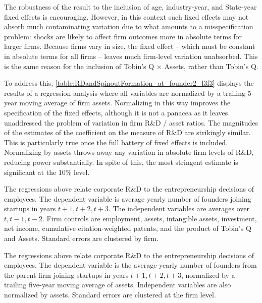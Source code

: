 \documentclass[11pt,english]{article}
\theoremstyle{remark}
\begin{document}
The robustness of the result to the inclusion of age, industry-year, and State-year fixed effects is encouraging. However, in this context such fixed effects may not absorb much contaminating variation due to what amounts to a misspecification problem: shocks are likely to affect firm outcomes more in absolute terms for larger firms. Because firms vary in size, the fixed effect -- which must be constant in absolute terms for all firms -- leaves much firm-level variation unabsorbed. This is the same reason for the inclusion of Tobin's Q $\times$ Assets, rather than Tobin's Q. 

To address this, \autoref{table:RDandSpinoutFormation_at_founder2_l3f3} displays the results of a regression analysis where all variables are normalized by a trailing 5-year moving average of firm assets. Normalizing in this way improves the specification of the fixed effects, although it is not a panacea as it leaves unaddressed the problem of variation in firm R\&D / asset ratios. The magnitudes of the estimates of the coefficient on the measure of R\&D are strikingly similar. This is particularly true once the full battery of fixed effects is included. Normalizing by assets throws away any variation in absolute firm levels of R\&D, reducing power substantially. In spite of this, the most stringent estimate is significant at the 10\% level.

\begin{table}[!htb]
	\scriptsize
	\centering
	
	\caption{The regressions above relate corporate R\&D to the entrepreneurship decisions of employees. The dependent variable is average yearly number of founders joining startups in years $t+1,t+2,t+3$. The independent variables are averages over $t,t-1,t-2$. Firm controls are employment, assets, intangible assets, investment, net income, cumulative citation-weighted patents, and the product of Tobin's Q and Assets. Standard errors are clustered by firm.}
	\label{table:RDandSpinoutFormation_absolute_founder2_l3f3}
\end{table}

\begin{table}[!htb]
	\scriptsize
	\centering
	
	\caption{The regressions above relate corporate R\&D to the entrepreneurship decisions of employees. The dependent variable is the average yearly number of founders from the parent firm joining startups in years $t+1,t+2,t+3$, normalized by a trailing five-year moving average of assets. Independent variables are also normalized by assets. Standard errors are clustered at the firm level.}
	\label{table:RDandSpinoutFormation_at_founder2_l3f3}
\end{table}
\end{document}
